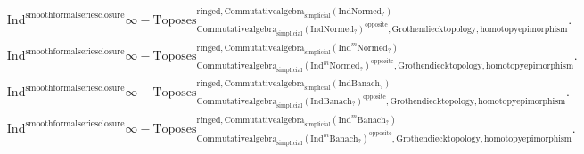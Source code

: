 \documentclass[11pt]{book}
\theoremstyle{definition}
\numberwithin{equation}{section}
\begin{document}
\begin{align}
&\mathrm{Ind}^\text{smoothformalseriesclosure}\infty-\mathrm{Toposes}^{\mathrm{ringed},\mathrm{Commutativealgebra}_{\mathrm{simplicial}}(\mathrm{Ind}\mathrm{Normed}_?)}_{\mathrm{Commutativealgebra}_{\mathrm{simplicial}}(\mathrm{Ind}\mathrm{Normed}_?)^\mathrm{opposite},\mathrm{Grothendiecktopology,homotopyepimorphism}}.\\
&\mathrm{Ind}^\text{smoothformalseriesclosure}\infty-\mathrm{Toposes}^{\mathrm{ringed},\mathrm{Commutativealgebra}_{\mathrm{simplicial}}(\mathrm{Ind}^m\mathrm{Normed}_?)}_{\mathrm{Commutativealgebra}_{\mathrm{simplicial}}(\mathrm{Ind}^m\mathrm{Normed}_?)^\mathrm{opposite},\mathrm{Grothendiecktopology,homotopyepimorphism}}.\\
&\mathrm{Ind}^\text{smoothformalseriesclosure}\infty-\mathrm{Toposes}^{\mathrm{ringed},\mathrm{Commutativealgebra}_{\mathrm{simplicial}}(\mathrm{Ind}\mathrm{Banach}_?)}_{\mathrm{Commutativealgebra}_{\mathrm{simplicial}}(\mathrm{Ind}\mathrm{Banach}_?)^\mathrm{opposite},\mathrm{Grothendiecktopology,homotopyepimorphism}}.\\
&\mathrm{Ind}^\text{smoothformalseriesclosure}\infty-\mathrm{Toposes}^{\mathrm{ringed},\mathrm{Commutativealgebra}_{\mathrm{simplicial}}(\mathrm{Ind}^m\mathrm{Banach}_?)}_{\mathrm{Commutativealgebra}_{\mathrm{simplicial}}(\mathrm{Ind}^m\mathrm{Banach}_?)^\mathrm{opposite},\mathrm{Grothendiecktopology,homotopyepimorphism}}.\\ 
\end{align}
\end{document}
